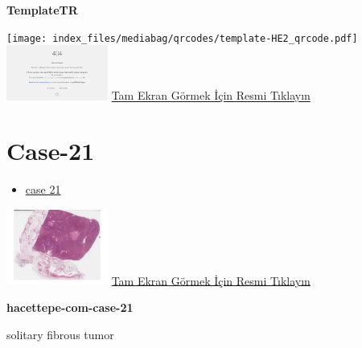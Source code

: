 \documentclass[
  letterpaper,
  DIV=11,
  numbers=noendperiod]{scrreprt}
\providecommand{\tightlist}{%
  \setlength{\itemsep}{0pt}\setlength{\parskip}{0pt}}\usepackage{longtable,booktabs,array}
\begin{document}
\textbf{TemplateTR}

\texttt{[image: index\_files/mediabag/qrcodes/template-HE2\_qrcode.pdf]}
\href{https://images.patolojiatlasi.com/template/HE2.html}{\includegraphics[width=0.25\textwidth,height=\textheight]{./screenshots/thumbnail_template-HE2.png}}
\href{https://images.patolojiatlasi.com/template/HE2.html}{Tam Ekran
Görmek İçin Resmi Tıklayın}

\hypertarget{sec-hacettepe-case-of-the-month-case-21}{%
\section{Case-21}\label{sec-hacettepe-case-of-the-month-case-21}}

\begin{itemize}
\tightlist
\item
  \href{https://www.youtube.com/watch?v=Uith4SvB2_Q&ab_channel=KemalKosemehmetoglu}{case
  21}
\end{itemize}

\href{https://images.patolojiatlasi.com/hacettepe-com-case-21/HE.html}{\includegraphics[width=0.25\textwidth,height=\textheight]{./screenshots/thumbnail_hacettepe-com-case-21.png}}
\href{https://images.patolojiatlasi.com/hacettepe-com-case-21/HE.html}{Tam
Ekran Görmek İçin Resmi Tıklayın}

\textbf{hacettepe-com-case-21}

\begin{tcolorbox}[enhanced jigsaw, breakable, opacitybacktitle=0.6, arc=.35mm, colbacktitle=quarto-callout-tip-color!10!white, colback=white, toptitle=1mm, left=2mm, opacityback=0, colframe=quarto-callout-tip-color-frame, titlerule=0mm, rightrule=.15mm, bottomrule=.15mm, toprule=.15mm, bottomtitle=1mm, title=\textcolor{quarto-callout-tip-color}{\faLightbulb}\hspace{0.5em}{Tanı}, coltitle=black, leftrule=.75mm]

solitary fibrous tumor

\end{tcolorbox}
\end{document}
